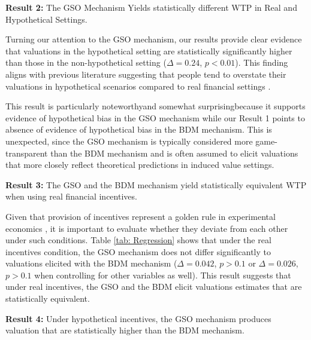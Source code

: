 \documentclass[12pt]{article}
\begin{document}
 
\vspace{0.5cm}

\textbf{Result 2:} The GSO Mechanism Yields statistically different WTP in Real and Hypothetical Settings. 

Turning our attention to the GSO mechanism, our results provide clear evidence that valuations in the hypothetical setting are statistically significantly higher than those in the non-hypothetical setting (\(\Delta = 0.24\), \(p < 0.01\)). This finding aligns with previous literature suggesting that people tend to overstate their valuations in hypothetical scenarios compared to real financial settings \citep{penn2018understanding, fang_use_2021}. 

This result is particularly noteworthy\textemdash and somewhat surprising\textemdash because it supports evidence of hypothetical bias in the GSO mechanism while our Result 1 points to absence of evidence of hypothetical bias  in the BDM mechanism. This is unexpected, since the GSO mechanism is typically considered more game-transparent than the BDM mechanism and is often assumed to elicit valuations that more closely reflect theoretical predictions in induced value settings. 

\vspace{0.5cm}



\textbf{Result 3:} The GSO and the BDM mechanism yield statistically equivalent WTP when using real financial incentives. 

Given that provision of incentives represent a golden rule in experimental economics \citep{smith_experimental_1976}, it is important to evaluate whether they deviate from each other under such conditions. Table \ref{tab: Regression} shows that under the real incentives condition, the GSO mechanism does not differ significantly to valuations elicited with the BDM mechanism (\(\Delta = 0.042\), \(p > 0.1\) or \(\Delta = 0.026\), \(p > 0.1\) when controlling for other variables as well). This result suggests that under real incentives, the GSO and the BDM elicit valuations estimates that are statistically equivalent.

\vspace{0.5cm}

\textbf{Result 4:} Under hypothetical incentives, the GSO mechanism produces valuation that are statistically higher than the BDM mechanism.
\end{document}
